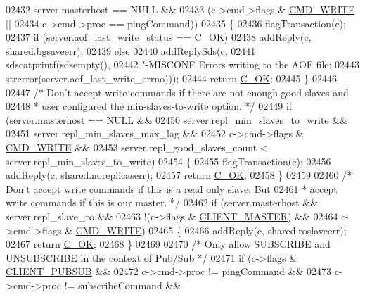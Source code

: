 \begin{DoxyCode}
{{{{{{{{{{{{{{{{{{{{{{{{{{{{{{{02432         server.masterhost == NULL &&
02433         (c->cmd->flags & \hyperlink{server_8h_a7391deb9c3a262ded3e186e94eb884e2}{CMD\_WRITE} ||
02434          c->cmd->proc == pingCommand))
02435     \{
02436         flagTransaction(c);
02437         \textcolor{keywordflow}{if} (server.aof\_last\_write\_status == \hyperlink{server_8h_a303769ef1065076e68731584e758d3e1}{C\_OK})
02438             addReply(c, shared.bgsaveerr);
02439         \textcolor{keywordflow}{else}
02440             addReplySds(c,
02441                 sdscatprintf(sdsempty(),
02442                 \textcolor{stringliteral}{"-MISCONF Errors writing to the AOF file: %
02443                 strerror(server.aof\_last\_write\_errno)));
02444         \textcolor{keywordflow}{return} \hyperlink{server_8h_a303769ef1065076e68731584e758d3e1}{C\_OK};
02445     \}
02446 
02447     \textcolor{comment}{/* Don't accept write commands if there are not enough good slaves and}
02448 \textcolor{comment}{     * user configured the min-slaves-to-write option. */}
02449     \textcolor{keywordflow}{if} (server.masterhost == NULL &&
02450         server.repl\_min\_slaves\_to\_write &&
02451         server.repl\_min\_slaves\_max\_lag &&
02452         c->cmd->flags & \hyperlink{server_8h_a7391deb9c3a262ded3e186e94eb884e2}{CMD\_WRITE} &&
02453         server.repl\_good\_slaves\_count < server.repl\_min\_slaves\_to\_write)
02454     \{
02455         flagTransaction(c);
02456         addReply(c, shared.noreplicaserr);
02457         \textcolor{keywordflow}{return} \hyperlink{server_8h_a303769ef1065076e68731584e758d3e1}{C\_OK};
02458     \}
02459 
02460     \textcolor{comment}{/* Don't accept write commands if this is a read only slave. But}
02461 \textcolor{comment}{     * accept write commands if this is our master. */}
02462     \textcolor{keywordflow}{if} (server.masterhost && server.repl\_slave\_ro &&
02463         !(c->flags & \hyperlink{server_8h_a3d8f0cc8d0653ee2b6dafb454292c069}{CLIENT\_MASTER}) &&
02464         c->cmd->flags & \hyperlink{server_8h_a7391deb9c3a262ded3e186e94eb884e2}{CMD\_WRITE})
02465     \{
02466         addReply(c, shared.roslaveerr);
02467         \textcolor{keywordflow}{return} \hyperlink{server_8h_a303769ef1065076e68731584e758d3e1}{C\_OK};
02468     \}
02469 
02470     \textcolor{comment}{/* Only allow SUBSCRIBE and UNSUBSCRIBE in the context of Pub/Sub */}
02471     \textcolor{keywordflow}{if} (c->flags & \hyperlink{server_8h_a20f2f5380db97cd09013118ffc9411cc}{CLIENT\_PUBSUB} &&
02472         c->cmd->proc != pingCommand &&
02473         c->cmd->proc != subscribeCommand &&
}}}}}}}}}}}}}}}}}}}}}}}}}}}}}}}}
\end{DoxyCode}
